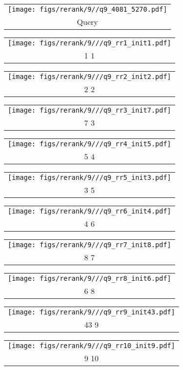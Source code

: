 \begin{figure*}[t]
 \begin{tabular}{@{\sssp}c@{\sssp}}\texttt{[image: figs/rerank/9//q9\_4081\_5270.pdf]}\\Query\\ \end{tabular} 
 \begin{tabular}{@{\sssp}c@{\sssp}}\texttt{[image: figs/rerank/9///q9\_rr1\_init1.pdf]}\\1  1\\ \end{tabular} 
 \begin{tabular}{@{\sssp}c@{\sssp}}\texttt{[image: figs/rerank/9///q9\_rr2\_init2.pdf]}\\2  2\\ \end{tabular} 
 \begin{tabular}{@{\sssp}c@{\sssp}}\texttt{[image: figs/rerank/9///q9\_rr3\_init7.pdf]}\\7  3\\ \end{tabular} 
 \begin{tabular}{@{\sssp}c@{\sssp}}\texttt{[image: figs/rerank/9///q9\_rr4\_init5.pdf]}\\5  4\\ \end{tabular} 
 \begin{tabular}{@{\sssp}c@{\sssp}}\texttt{[image: figs/rerank/9///q9\_rr5\_init3.pdf]}\\3  5\\ \end{tabular} 
 \begin{tabular}{@{\sssp}c@{\sssp}}\texttt{[image: figs/rerank/9///q9\_rr6\_init4.pdf]}\\4  6\\ \end{tabular} 
 \begin{tabular}{@{\sssp}c@{\sssp}}\texttt{[image: figs/rerank/9///q9\_rr7\_init8.pdf]}\\8  7\\ \end{tabular} 
 \begin{tabular}{@{\sssp}c@{\sssp}}\texttt{[image: figs/rerank/9///q9\_rr8\_init6.pdf]}\\6  8\\ \end{tabular} 
 \begin{tabular}{@{\sssp}c@{\sssp}}\texttt{[image: figs/rerank/9///q9\_rr9\_init43.pdf]}\\43  9\\ \end{tabular} 
 \begin{tabular}{@{\sssp}c@{\sssp}}\texttt{[image: figs/rerank/9///q9\_rr10\_init9.pdf]}\\9  10\\ \end{tabular} 


\end{figure*}
